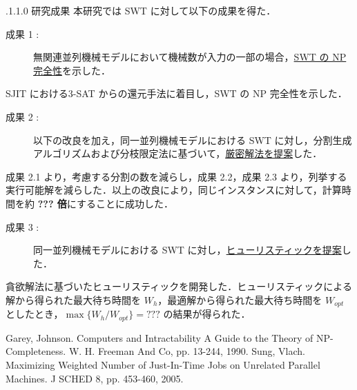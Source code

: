 \documentclass[oneside, 10pt, twocolumn]{jarticle}
\makeatletter
\def\section{\@startsection {section}{1}{\z@}{-3.5ex plus -1ex minus
-.2ex}{2.3 ex plus .2ex}{\large\bf}}
\renewcommand{\section}{
\@startsection{section}{1}{\z@}
{.1\Cvs \@plus.0\Cdp \@minus.1\Cdp}%
{.1\Cvs \@plus.1\Cdp \@minus.0\Cdp}%
{\reset@font\large\bfseries}}      %
\makeatother
\begin{document}
\section{研究成果}
本研究では SWT に対して以下の成果を得た．
\begin{description}
  \item[成果 1 : ]
  無関連並列機械モデルにおいて機械数が入力の一部の場合，\underline{SWT の NP 完全性}を示した．
\end{description}
SJIT における\textsc{3-SAT} からの還元手法に着目し，SWT の NP 完全性を示した．

\begin{description}
  \item[成果 2 : ]
  以下の改良を加え，同一並列機械モデルにおける SWT に対し，分割生成アルゴリズムおよび分枝限定法に基づいて，\underline{厳密解法を提案}した．
\end{description}
成果 2.1 より，考慮する分割の数を減らし，成果 2.2，成果 2.3 より，列挙する実行可能解を減らした．以上の改良により，同じインスタンスに対して，計算時間を約 {\bf ??? 倍}にすることに成功した．

\begin{description}
  \item[成果 3 : ]
  同一並列機械モデルにおける SWT に対し，\underline{ヒューリスティックを提案}した．
\end{description}
貪欲解法に基づいたヒューリスティックを開発した．ヒューリスティックによる解から得られた最大待ち時間を $W_h$，最適解から得られた最大待ち時間を $W_{opt}$ としたとき，\mbox{\boldmath $\max\big\{W_h/W_{opt}\big\} = ???$} の結果が得られた．

\begin{thebibliography}{9} %
  Garey, Johnson.
  Computers and Intractability A Guide to the Theory of NP-Completeness.
  W. H. Freeman And Co, pp. 13-244, 1990.
  \vspace{-2mm}
  Sung, Vlach.
  Maximizing Weighted Number of Just-In-Time Jobs on Unrelated Parallel Machines. J SCHED 8, pp. 453-460, 2005.
\end{thebibliography}
\end{document}
